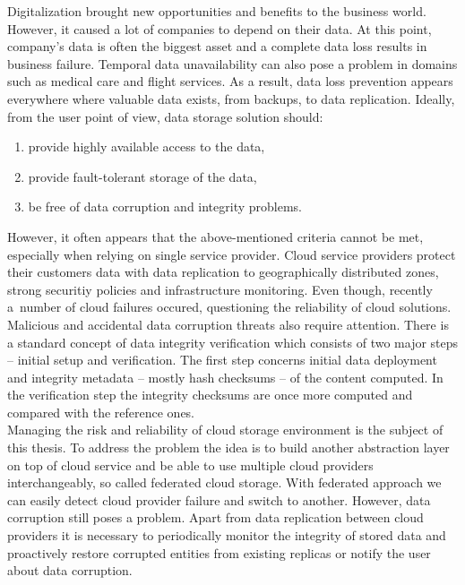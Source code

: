 Digitalization brought new opportunities and benefits to the business world.
However, it caused a lot of companies to depend on their data. At this point,
company's data is often the biggest asset and a complete data loss results in 
business failure. Temporal data unavailability can also pose a problem in domains
such as medical care and flight services. As a result, data loss prevention appears
everywhere where valuable data exists, from backups, to data replication. Ideally,
from the user point of view, data storage solution should:

\begin{enumerate}
\item provide highly available access to the data,
\item provide fault-tolerant storage of the data,
\item be free of data corruption and integrity problems.
\end{enumerate}

However, it often appears that the above-mentioned criteria cannot be met,
especially when relying on single service provider. Cloud service providers protect
their customers data with data replication to geographically distributed zones,
strong securitiy policies and infrastructure monitoring. Even though, recently
a~number of cloud failures occured, questioning the reliability of
cloud solutions. Malicious and accidental data corruption threats also require
attention. There is a standard concept of data integrity verification which consists
of two major steps -- initial setup and verification. The first step concerns
initial data deployment and integrity metadata -- mostly hash checksums -- of the
content computed. In the verification step the integrity checksums are once more
computed and compared with the reference ones.\\

Managing the risk and reliability of cloud storage environment is the subject of this
thesis. To address the problem the idea is to build another abstraction layer on top
of cloud service and be able to use multiple cloud providers interchangeably, so called
federated cloud storage. With federated approach we can easily detect cloud provider
failure and switch to another. However, data corruption still poses a problem. Apart
from data replication between cloud providers it is necessary to periodically monitor
the integrity of stored data and proactively restore corrupted entities from existing
replicas or notify the user about data corruption.

